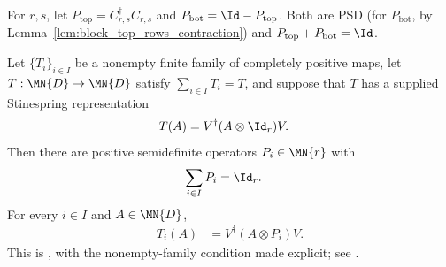 \begin{definition}
    \label{def:block_diag_projectors}
    \leanok
    For $r,s$, let $P_{\mathrm{top}}=C_{r,s}^\dagger C_{r,s}$ and
    $P_{\mathrm{bot}}=\Id-P_{\mathrm{top}}$. Both are PSD
    (for $P_{\mathrm{bot}}$, by Lemma~\ref{lem:block_top_rows_contraction})
    and $P_{\mathrm{top}}+P_{\mathrm{bot}}=\Id$.
\end{definition}

\begin{theorem}
    \label{thm:cp_radon_nikodym_of_stinespring}
    \leanok
    Let $\{T_i\}_{i\in I}$ be a nonempty finite family of completely positive
    maps, let $T:\MN{D}\to\MN{D}$ satisfy $\sum_{i\in I}T_i=T$, and
    suppose that $T$ has a supplied Stinespring representation
    \begin{align}
        T(A)
        &=V^\dagger(A\otimes\Id_r)V.
        \label{eq:representations_radon_dilation}
    \end{align}
    Then there are positive semidefinite operators $P_i\in\MN{r}$ with
    \begin{align}
        \sum_{i\in I}P_i
        &=\Id_r.
        \label{eq:representations_radon_resolution}
    \end{align}
    For every $i\in I$ and $A\in\MN{D}$,
    \begin{align}
        T_i(A)
        &=V^\dagger(A\otimes P_i)V.
        \label{eq:representations_radon_components}
    \end{align}
    This is \cite[Theorem~2.4]{Wolf2012Quantum}, with the nonempty-family condition
    made explicit; see
    .
\end{theorem}

